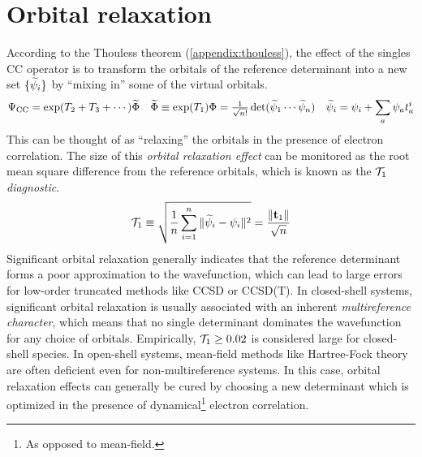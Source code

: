 \documentclass[11pt]{article}
\numberwithin{equation}{section}
\begin{document}
\setlength{\abovedisplayskip}{5pt}
\setlength{\belowdisplayskip}{5pt}


\setcounter{section}{7}
\section{Orbital relaxation}


\begin{rmk}
According to the Thouless theorem (\cref{appendix:thouless}), the effect of the singles CC operator is to transform the orbitals of the reference determinant into a new set $\{\widetilde{\psi }_i\}$ by ``mixing in'' some of the virtual orbitals.
\begin{align}
  \Psi _{\mathrm{CC}}
=
  \mathrm{exp}(T_2 + T_3 + \cdots)
  \widetilde{\Phi }
&&
  \widetilde{\Phi }
\equiv
  \mathrm{exp}(T_1)
  \Phi 
=
  \tfrac{1}{\sqrt{n!}}\,
  \mathrm{det}(\widetilde{\psi }_1\cdots \widetilde{\psi }_n)
&&
  \widetilde{\psi }_i
=
  \psi _i
+
  \sum_a
  \psi _a
  t_a^i
\end{align}
This can be thought of as ``relaxing'' the orbitals in the presence of electron correlation.
The size of this \textit{orbital relaxation effect} can be monitored as the root mean square difference from the reference orbitals, which is known as the \textit{$\mathcal{T}_1$ diagnostic}.
\begin{align}
  \mathcal{T}_1
\equiv
  \sqrt{
  \frac {1}{n}
  \sum_{i=1}^n
  \|\widetilde{\psi }_i - \psi _i\|^2
  }
=
  \frac {\|\mathbf{t}_1\|}{\sqrt{n}}
\end{align}
Significant orbital relaxation generally indicates that the reference determinant forms a poor approximation to the wavefunction, which can lead to large errors for low-order truncated methods like CCSD or CCSD(T).
In closed-shell systems, significant orbital relaxation is usually associated with an inherent \textit{multireference character}, which means that no single determinant dominates the wavefunction for any choice of orbitals.
Empirically, $\mathcal{T}_1\geq 0.02$ is considered large for closed-shell species.
In open-shell systems, mean-field methods like Hartree-Fock theory are often deficient even for non-multireference systems.
In this case, orbital relaxation effects can generally be cured by choosing a new determinant which is optimized in the presence of dynamical\footnote{As opposed to mean-field.} electron correlation.
\end{rmk}
\end{document}
